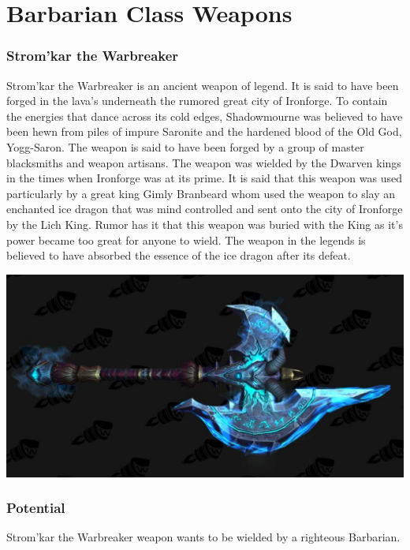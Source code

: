 \section{Barbarian Class Weapons}

\subsubsection{Strom'kar the Warbreaker}

Strom'kar the Warbreaker is an ancient weapon of legend. It is said to have been forged in the lava's underneath the rumored great city of Ironforge. To contain the energies that dance across its cold edges, Shadowmourne was believed to have been hewn from piles of impure Saronite and the hardened blood of the Old God, Yogg-Saron. The weapon is said to have been forged by a group of master blacksmiths and weapon artisans. The weapon was wielded by the Dwarven kings in the times when Ironforge was at its prime. It is said that this weapon was used particularly by a great king Gimly Branbeard whom used the weapon to slay an enchanted ice dragon that was mind controlled and sent onto the city of Ironforge by the Lich King. Rumor has it that this weapon was buried with the King as it's power became too great for anyone to wield. The weapon in the legends is believed to have absorbed the essence of the ice dragon after its defeat.

\begin{center}
	\includegraphics[width=\linewidth]{img/weapons/stromkar.jpg}
\end{center}

\subsubsection{Potential}

Strom'kar the Warbreaker weapon wants to be wielded by a righteous Barbarian. 

